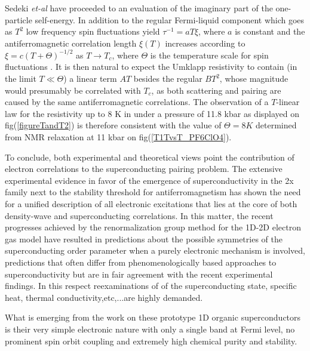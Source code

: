 \documentclass[11pt]{article} %
\begin{document}
Sedeki \textit{et-al}\cite{Sedeki10} have proceeded to an  evaluation of the imaginary part of the one-particle self-energy.  In addition to the regular Fermi-liquid component which goes as $T^2$ low frequency spin fluctuations  yield $\tau^{-1} = aT\xi $, where $a$ is constant and the antiferromagnetic correlation length $\xi(T)$ increases according to $\xi = c(T + \Theta)^{-1/2}$ as $T \rightarrow T_c$, where $\Theta$ is the temperature scale for spin fluctuations \cite{Sedeki10}.  It is then natural to expect the Umklapp resistivity to contain  (in the limit $T \ll \Theta$) a linear term $AT$ besides the regular $BT^2$, whose magnitude would presumably be correlated with $T_c$, as both scattering and pairing are caused by the same antiferromagnetic correlations. The observation of a $T$-linear law for the resistivity up to 8 K  in  under a pressure of 11.8 kbar as displayed on fig(\ref{figureTandT2})   is therefore  consistent with the value of $\Theta=8K$ determined from NMR relaxation at 11 kbar on fig(\ref{T1TvsT_PF6ClO4}).

To conclude, both  experimental and  theoretical views point the contribution of  electron correlations to the superconducting pairing problem. The extensive experimental evidence  in favor of  the   emergence of superconductivity in the \tm2x family next to the  stability threshold for antiferromagnetism  has shown the need for a unified description of all electronic excitations that lies at the core of  both density-wave and superconducting correlations. In this matter, the  recent progresses achieved by the renormalization group method for the 1D-2D electron  gas model  have resulted  in  predictions about the possible symmetries of the superconducting order parameter when a purely electronic mechanism is involved,  predictions that often differ from  phenomenologically based   approaches to superconductivity but are in fair agreement with the recent experimental findings.  In this respect reexaminations of  of  the superconducting state, specific heat, thermal conductivity,etc,...are highly demanded.%
 
What is emerging from   the  work on these prototype 1D  organic superconductors is   their  very simple electronic nature  with only a single band at Fermi level, no prominent spin orbit coupling and extremely high chemical purity and stability. 
\end{document}

